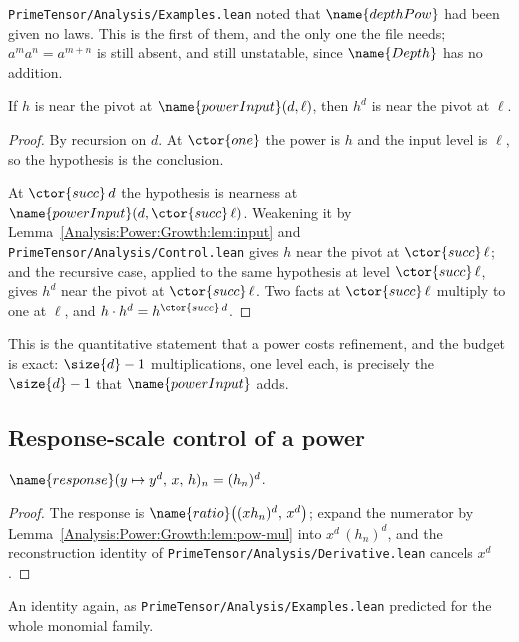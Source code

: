 \texttt{PrimeTensor/Analysis/Examples.lean} noted that $\name{depthPow}$ had
been given no laws.  This is the first of them, and the only one the file
needs; $a^{m}a^{n} = a^{m+n}$ is still absent, and still unstatable, since
$\name{Depth}$ has no addition.

\begin{theorem}
\label{Analysis:Power:Growth:thm:pow-near}
If $h$ is near the pivot at $\name{powerInput}(d,\ell)$, then $h^{d}$ is near
the pivot at $\ell$.
\end{theorem}

\begin{proof}
By recursion on $d$.  At $\ctor{one}$ the power is $h$ and the input level is
$\ell$, so the hypothesis is the conclusion.

At $\ctor{succ}\,d$ the hypothesis is nearness at
$\name{powerInput}(d, \ctor{succ}\,\ell)$.  Weakening it by
Lemma~\ref{Analysis:Power:Growth:lem:input} and
\texttt{PrimeTensor/Analysis/Control.lean} gives $h$ near the pivot at
$\ctor{succ}\,\ell$; and the recursive case, applied to the same hypothesis at
level $\ctor{succ}\,\ell$, gives $h^{d}$ near the pivot at $\ctor{succ}\,\ell$.
Two facts at $\ctor{succ}\,\ell$ multiply to one at $\ell$, and
$h \cdot h^{d} = h^{\ctor{succ}\,d}$.
\end{proof}

This is the quantitative statement that a power costs refinement, and the
budget is exact: $\size{d}-1$ multiplications, one level each, is precisely the
$\size{d}-1$ that $\name{powerInput}$ adds.

\subsection{Response-scale control of a power}

\begin{lemma}\label{Analysis:Power:Growth:lem:response}
$\name{response}(y \mapsto y^{d},\, x,\, h)_n = (h_n)^{d}$.
\end{lemma}

\begin{proof}
The response is $\name{ratio}\bigl((x h_n)^{d},\, x^{d}\bigr)$; expand the
numerator by Lemma~\ref{Analysis:Power:Growth:lem:pow-mul} into
$x^{d}\,(h_n)^{d}$, and the reconstruction identity of
\texttt{PrimeTensor/Analysis/Derivative.lean} cancels $x^{d}$.
\end{proof}

An identity again, as
\texttt{PrimeTensor/Analysis/Examples.lean} predicted for the whole monomial
family.

